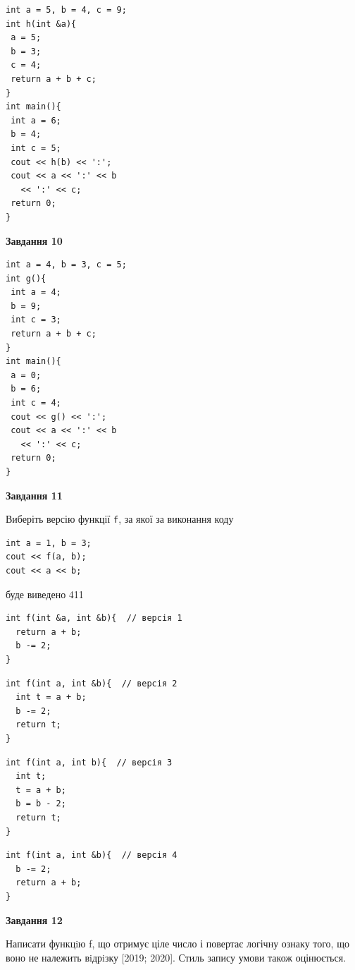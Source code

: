\documentclass[12pt, ukrainian]{article}
\def\code#1{\Verb!#1!}
\begin{document}
{\begin {large}
\begin{minipage}[t]{7.0cm}
\begin{verbatim}
int a = 5, b = 4, c = 9;
int h(int &a){
 a = 5;
 b = 3;
 c = 4;
 return a + b + c;
}
int main(){
 int a = 6;
 b = 4;
 int c = 5;
 cout << h(b) << ':';
 cout << a << ':' << b 
   << ':' << c;
 return 0;
}
\end{verbatim}



\begin{center}
\textbf{Завдання 10}
\end{center}
\vspace{-8mm}

\begin{verbatim}
int a = 4, b = 3, c = 5;
int g(){
 int a = 4;
 b = 9;
 int c = 3;
 return a + b + c;
}
int main(){
 a = 0;
 b = 6;
 int c = 4;
 cout << g() << ':';
 cout << a << ':' << b 
   << ':' << c;
 return 0;
}
\end{verbatim}

\end{minipage}
\vline \hspace{1mm}
\begin{minipage}[t]{11.0cm}

\begin{center}
\textbf{Завдання 11}
\end{center}
Виберіть версію функції \code{f}, за якої за виконання коду
\begin{verbatim}
int a = 1, b = 3;
cout << f(a, b);
cout << a << b;
\end{verbatim}

буде виведено 411

\begin{verbatim}
int f(int &a, int &b){  // версія 1
  return a + b;
  b -= 2;
}
\end{verbatim}

\vspace{-8mm}\begin{verbatim}
int f(int a, int &b){  // версія 2
  int t = a + b;
  b -= 2;
  return t;
}
\end{verbatim}

\vspace{-8mm}\begin{verbatim}
int f(int a, int b){  // версія 3
  int t;
  t = a + b;
  b = b - 2;
  return t;
}
\end{verbatim}

\vspace{-8mm}\begin{verbatim}
int f(int a, int &b){  // версія 4
  b -= 2;
  return a + b;
}
\end{verbatim}



\begin{center}
\textbf{Завдання 12}
\end{center}

Написати функцiю f, що отримує ціле число і повертає логічну ознаку того, що воно не належить вiдрiзку [2019; 2020]. Стиль запису умови також оцінюється.\par

\end{minipage}

\end {large}}
\end{document}
